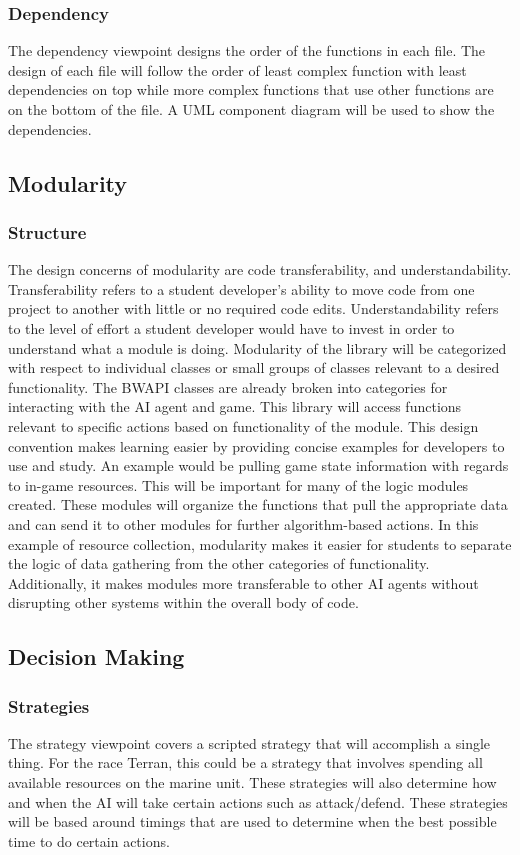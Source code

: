 \documentclass[10pt,letterpaper,onecolumn,draftclsnofoot]{IEEEtran}
\begin{document}
\subsubsection{Dependency}
	The dependency viewpoint designs the order of the functions in each file. The design of each file will follow the order of least complex function with least dependencies on top while more complex functions that use other functions are on the bottom of the file. A UML component diagram will be used to show the dependencies.
\subsection{Modularity}
\subsubsection{Structure}
	The design concerns of modularity are code transferability, and understandability. Transferability refers to a student developer's ability to move code from one project to another with little or no required code edits. Understandability refers to the level of effort a student developer would have to invest in order to understand what a module is doing. Modularity of the library will be categorized with respect to individual classes or small groups of classes relevant to a desired functionality. The BWAPI classes are already broken into categories for interacting with the AI agent and game. This library will access functions relevant to specific actions based on functionality of the module. This design convention makes learning easier by providing concise examples for developers to use and study.
	An example would be pulling game state information with regards to in-game resources. This will be important for many of the logic modules created. These modules will organize the functions that pull the appropriate data and can send it to other modules for further algorithm-based actions. In this example of resource collection, modularity makes it easier for students to separate the logic of data gathering from the other categories of functionality. Additionally, it makes modules more transferable to other AI agents without disrupting other systems within the overall body of code. 
\subsection{Decision Making}
\subsubsection{Strategies}
	The strategy viewpoint covers a scripted strategy that will accomplish a single thing. For the race Terran, this could be a strategy that involves spending all available resources on the marine unit. These strategies will also determine how and when the AI will take certain actions such as attack/defend. These strategies will be based around timings that are used to determine when the best possible time to do certain actions.
\end{document}
